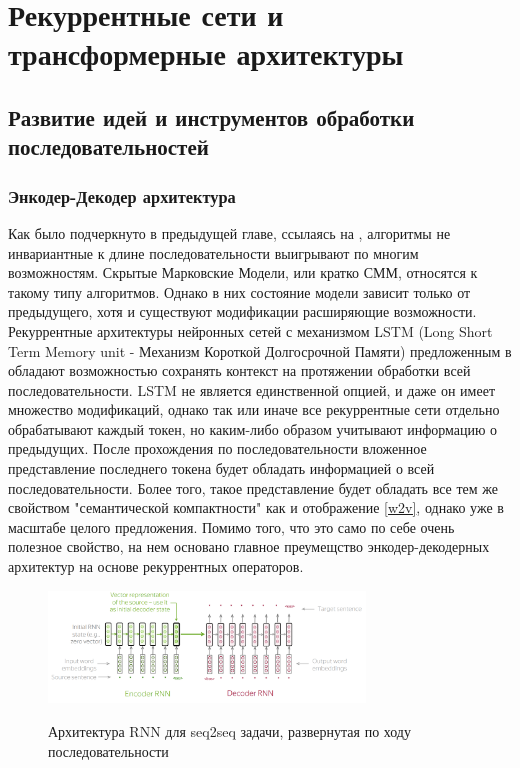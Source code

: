 \section{Рекуррентные сети и  трансформерные архитектуры}
\subsection{Развитие идей и инструментов обработки последовательностей}
\subsubsection{Энкодер-Декодер архитектура}
Как было подчеркнуто в предыдущей главе, ссылаясь на \cite{RNN_survey}, алгоритмы не инвариантные к длине последовательности выигрывают по многим возможностям. Скрытые Марковские Модели, или кратко СММ, относятся к такому типу алгоритмов. Однако в них состояние модели зависит только от предыдущего, хотя и существуют модификации расширяющие возможности. Рекуррентные архитектуры нейронных сетей с механизмом LSTM (Long Short Term Memory unit - Механизм Короткой Долгосрочной Памяти) предложенным в \cite{LSTM} обладают возможностью сохранять контекст на протяжении обработки всей последовательности. LSTM не является единственной опцией, и даже он имеет множество модификаций, однако так или иначе все рекуррентные сети отдельно обрабатывают каждый токен, но каким-либо образом учитывают информацию о предыдущих. После прохождения по последовательности вложенное представление последнего токена будет обладать информацией о всей последовательности. Более того, такое представление будет обладать все тем же свойством "семантической компактности" как и отображение \ref{w2v}, однако уже в масштабе целого предложения.
Помимо того, что это само по себе очень полезное свойство, на нем основано главное преумещство энкодер-декодерных архитектур на основе рекуррентных операторов.
\newline
\begin{figure}[h]
\caption{Архитектура RNN для seq2seq задачи, развернутая по ходу последовательности}
\centering
\includegraphics[width=0.75\textwidth]{rnn_arch_base.png}
\label{rnn_arch}
\end{figure}
